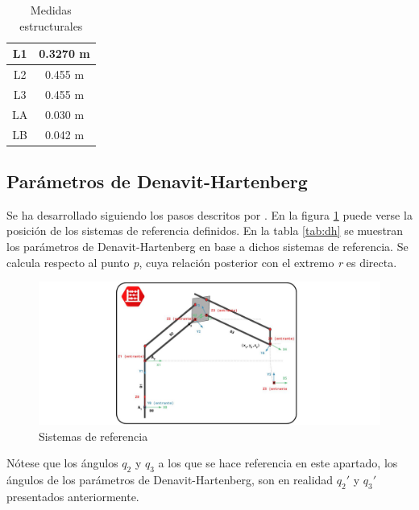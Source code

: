  \begin{table}[H]
    	\caption{Medidas estructurales}
    	\label{tab:medidas}
    	\begin{center}
    		\begin{tabular}{ |c|c| }
    			\hline
    			L1 & 0.3270 m \\
    			\hline
    			L2 & 0.455 m \\
    			\hline
    			L3 & 0.455 m \\
    			\hline
    			LA & 0.030 m \\
    			\hline
    			LB & 0.042 m \\
    			\hline
    		\end{tabular}
    	\end{center}
 \end{table}
	    
\subsection{Parámetros de Denavit-Hartenberg}
	Se ha desarrollado siguiendo los pasos descritos por \cite{barrientos}. En la figura \ref{fig:Control:dh} puede verse la posición de los sistemas de referencia definidos. En la tabla \ref{tab:dh} se muestran los parámetros de Denavit-Hartenberg en base a dichos sistemas de referencia. Se calcula respecto al punto \textit{p}, cuya relación posterior con el extremo \textit{r} es directa.
		
	\begin{figure}[H]
		\centering
		\includegraphics[width=1\textwidth]{figuras/Imagenes_cinematica/denavit-hartemberg_virtuales.jpg}
		\caption{Sistemas de referencia}
		\label{fig:Control:dh}
	\end{figure}
	
	Nótese que los ángulos $q_2$ y $q_3$ a los que se hace referencia en este apartado, los ángulos de los parámetros de Denavit-Hartenberg, son en realidad $q_2'$ y $q_3'$ presentados anteriormente.
	
